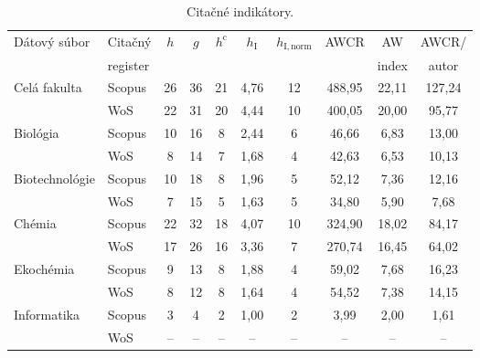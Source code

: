 \begin{table}
\centering\small
\begin{tabular}{llcccccccc}
  \hline\noalign{\vspace{.3ex}}
  Dátový súbor & Citačný  & $h$ & $g$ & $h^{\mathrm{c}}$ & $h_{\mathrm{I}}$ & $h_{\mathrm{I, norm}}$ & AWCR & AW    & AWCR/ \\
               & register &     &     &                  &                  &                        &       & index & autor \\[0.3ex]
  \hline\noalign{\vspace{.5ex}}
  Celá fakulta   & Scopus & 26 & 36 & 21 & 4,76 & 12 & 488,95 & 22,11 & 127,24 \\
                 & WoS    & 22 & 31 & 20 & 4,44 & 10 & 400,05 & 20,00 &  95,77 \\[1ex]
  Biológia       & Scopus & 10 & 16 &  8 & 2,44 &  6 &  46,66 &  6,83 &  13,00 \\
                 & WoS    &  8 & 14 &  7 & 1,68 &  4 &  42,63 &  6,53 &  10,13 \\[1ex]
  Biotechnológie & Scopus & 10 & 18 &  8 & 1,96 &  5 &  52,12 &  7,36 &  12,16 \\
                 & WoS    &  7 & 15 &  5 & 1,63 &  5 &  34,80 &  5,90 &   7,68 \\[1ex]
  Chémia         & Scopus & 22 & 32 & 18 & 4,07 & 10 & 324,90 & 18,02 &  84,17 \\
                 & WoS    & 17 & 26 & 16 & 3,36 &  7 & 270,74 & 16,45 &  64,02 \\[1ex]
  Ekochémia      & Scopus &  9 & 13 &  8 & 1,88 &  4 &  59,02 &  7,68 &  16,23 \\
                 & WoS    &  8 & 12 &  8 & 1,64 &  4 &  54,52 &  7,38 &  14,15 \\[1ex]
  Informatika    & Scopus &  3 &  4 &  2 & 1,00 &  2 &   3,99 &  2,00 &   1,61 \\
                 & WoS    & -- & -- & -- &  --  & -- &  --    & --    &  --    \\[0.5ex]
  \hline
\end{tabular}
\caption{Citačné indikátory.}
\label{tab:citation.indicators}
\end{table}

